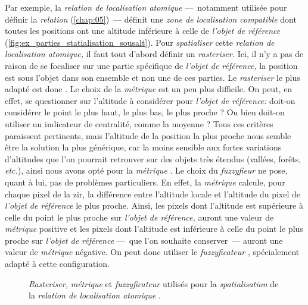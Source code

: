 %   

Par exemple, la \emph{relation de localisation atomique}
 ---~notamment utilisée pour définir
la \emph{relation} 
(\autoref{chap:05})~--- définit une \emph{zone de localisation
  compatible} dont toutes les positions ont une altitude inférieure à
celle de \emph{l'objet de référence}
(\autoref{fig:ex_parties_statialisation_sousalt}). Pour
\emph{spatialiser} cette \emph{relation de localisation atomique,} il
faut tout d'abord définir un \emph{rasteriser.} Ici, il n'y a pas de
raison de se focaliser sur une partie spécifique de \emph{l'objet de
  référence,} la position est sous l'objet dans son ensemble et non
une de ces parties. Le \emph{rasteriser} le plus adapté est donc
. Le choix de la \emph{métrique} est un peu plus
difficile. On peut, en effet, se questionner sur l'altitude à
considérer pour \emph{l'objet de référence:} doit-on considérer le
point le plus haut, le plus bas, le plus proche ? Ou bien doit-on
utiliser un indicateur de centralité, comme la moyenne ? Tous ces
critères paraissent pertinents, mais l'altitude de la position la plus
proche nous semble être la solution la plus générique, car la moins
sensible aux fortes variations d'altitudes que l'on pourrait retrouver
sur des objets très étendus (\eg vallées, forêts, \emph{etc.}), ainsi
nous avons opté pour la \emph{métrique}
. Le choix du \emph{fuzzyfieur} ne
pose, quant à lui, pas de problèmes particuliers. En effet, la
\emph{métrique}  calcule, pour chaque
pixel de la \ac{zir}, la différence entre l'altitude locale et
l'altitude du pixel de \emph{l'objet de référence} le plus
proche. Ainsi, les pixels dont l'altitude est supérieure à celle du
point le plus proche sur \emph{l'objet de référence,} auront une
valeur de \emph{métrique} positive et les pixels dont l'altitude est
inférieure à celle du point le plus proche sur \emph{l'objet de
  référence} ---~que l'on souhaite conserver~--- auront une valeur de
\emph{métrique} négative. On peut donc utiliser le
\emph{fuzzyficateur} , spécialement adapté à
cette configuration.

\begin{figure}
  \centering
  
  \caption{\emph{Rasteriser,} \emph{métrique} et \emph{fuzzyficateur}
    utilisés pour la \emph{spatialisation} de la \emph{relation de
      localisation atomique}
    \protect{}.}
  \label{fig:ex_parties_statialisation_sousalt}
\end{figure}

